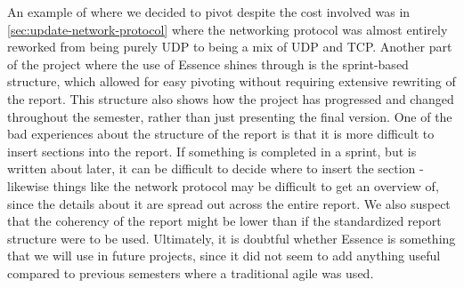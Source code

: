 An example of where we decided to pivot despite the cost involved was in \autoref{sec:update-network-protocol} where the networking protocol was almost entirely reworked from being purely UDP to being a mix of UDP and TCP.
Another part of the project where the use of Essence shines through is the sprint-based structure, which allowed for easy pivoting without requiring extensive rewriting of the report.
This structure also shows how the project has progressed and changed throughout the semester, rather than just presenting the final version.
One of the bad experiences about the structure of the report is that it is more difficult to insert sections into the report.
If something is completed in a sprint, but is written about later, it can be difficult to decide where to insert the section - likewise things like the network protocol may be difficult to get an overview of, since the details about it are spread out across the entire report. 
We also suspect that the coherency of the report might be lower than if the standardized report structure were to be used.
Ultimately, it is doubtful whether Essence is something that we will use in future projects, since it did not seem to add anything useful compared to previous semesters where a traditional agile was used.